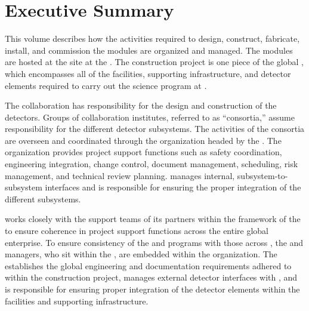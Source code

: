 \chapter{Executive Summary}

\label{vl:tc-execsum}




This volume describes how the activities required to design,
construct, fabricate, install, and commission the 
 modules are organized and managed. The  modules
are hosted at the  site at the . The
  construction project is one piece of the
global , which encompasses all of the facilities,
supporting infrastructure, and detector elements required to carry out
the  science program at .
      
The  collaboration has  responsibility for the design 
and construction of the  detectors.  Groups of collaboration 
institutes, referred to as ``consortia,'' assume responsibility for 
the different detector subsystems.  The activities of the consortia are 
overseen and coordinated through the   organization 
headed by the  .  The  organization 
provides project support functions such as safety coordination, 
engineering integration, change control, document management, scheduling, 
risk management, and technical review planning.    
manages internal, subsystem-to-subsystem interfaces and is responsible 
for ensuring the proper integration of the different subsystems.   

  works closely with the support teams of its 
 partners within the framework of the  to 
ensure coherence in project support functions across the entire global 
enterprise.  To ensure consistency of the   
and  programs with those across , the 
  and  managers, who sit within 
the , are embedded within the   
organization.  The  establishes the global engineering
and documentation requirements adhered to within the  
 construction project, manages external  detector 
interfaces with , and is responsible for ensuring proper 
integration of the  detector elements within the facilities 
and supporting infrastructure.

